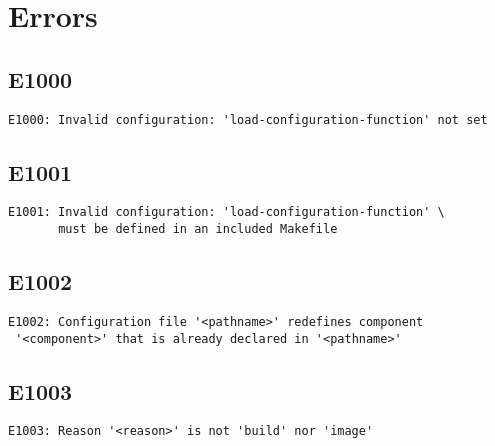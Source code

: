 %
%
%
%
\chapter{Errors}

\section{E1000}

\begin{verbatim}
E1000: Invalid configuration: 'load-configuration-function' not set
\end{verbatim}

\section{E1001}

\begin{verbatim}
E1001: Invalid configuration: 'load-configuration-function' \
       must be defined in an included Makefile
\end{verbatim}

\section{E1002}

\begin{verbatim}
E1002: Configuration file '<pathname>' redefines component
 '<component>' that is already declared in '<pathname>'
\end{verbatim}

\section{E1003}

\begin{verbatim}
E1003: Reason '<reason>' is not 'build' nor 'image'
\end{verbatim}

